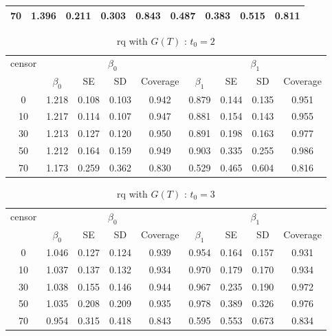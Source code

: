 \documentclass[12pt]{article}
\begin{document}
\begin{enumerate}
\begin{table}[hbt!]
\begin{tabular}{|c|c|c|c|c|c|c|c|c|}
  70 & 1.396 & 0.211 & 0.303 & 0.843 & 0.487 & 0.383 & 0.515 & 0.811 \\ 
				\hline
			\end{tabular}
		\end{table}
		\begin{table}[hbt!]
			\caption{rq with $G(T)$ : $t_0=2$}
			\centering
			\begin{tabular}{|c|c|c|c|c|c|c|c|c|}
				\hline
				\multirow{2}{*}{censor} & \multicolumn{4}{c|}{$\beta_0$} & \multicolumn{4}{c|}{$\beta_1$}\\ \cline{2-9}
				& $\beta_0$ & SE & SD  & Coverage  & $\beta_1$ & SE & SD & Coverage\\
				\hline\hline
				0 & 1.218 & 0.108 & 0.103 & 0.942 & 0.879 & 0.144 & 0.135 & 0.951 \\ 
  10 & 1.217 & 0.114 & 0.107 & 0.947 & 0.881 & 0.154 & 0.143 & 0.955 \\ 
  30 & 1.213 & 0.127 & 0.120 & 0.950 & 0.891 & 0.198 & 0.163 & 0.977 \\ 
  50 & 1.212 & 0.164 & 0.159 & 0.949 & 0.903 & 0.335 & 0.255 & 0.986 \\ 
  70 & 1.173 & 0.259 & 0.362 & 0.830 & 0.529 & 0.465 & 0.604 & 0.816 \\
				\hline
			\end{tabular}
		\end{table}
		\begin{table}[hbt!]
			\caption{rq with $G(T)$ : $t_0=3$}
			\centering
			\begin{tabular}{|c|c|c|c|c|c|c|c|c|}
				\hline
				\multirow{2}{*}{censor} & \multicolumn{4}{c|}{$\beta_0$} & \multicolumn{4}{c|}{$\beta_1$}\\ \cline{2-9}
				& $\beta_0$ & SE & SD  & Coverage  & $\beta_1$ & SE & SD & Coverage\\
				\hline\hline
				0 & 1.046 & 0.127 & 0.124 & 0.939 & 0.954 & 0.164 & 0.157 & 0.931 \\ 
  10 & 1.037 & 0.137 & 0.132 & 0.934 & 0.970 & 0.179 & 0.170 & 0.934 \\ 
  30 & 1.038 & 0.155 & 0.146 & 0.944 & 0.967 & 0.235 & 0.190 & 0.972 \\ 
  50 & 1.035 & 0.208 & 0.209 & 0.935 & 0.978 & 0.389 & 0.326 & 0.976 \\ 
  70 & 0.954 & 0.315 & 0.418 & 0.843 & 0.595 & 0.553 & 0.673 & 0.834 \\ 
				\hline
			\end{tabular}
		\end{table}
	

\end{enumerate}
\end{document}
